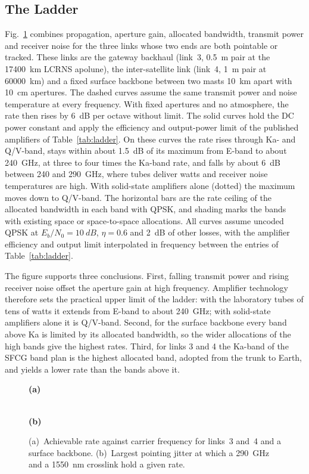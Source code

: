 \documentclass{IEEEoj}
\begin{document}
\subsection{The Ladder}
\label{sec:ladder}
Fig.~\ref{fig:ladder} combines propagation, aperture gain, allocated bandwidth, transmit power and receiver noise for the three links whose two ends are both pointable or tracked. These links are the gateway backhaul (link~3, \SI{0.5}{m} pair at the \SI{17400}{km} LCRNS apolune), the inter-satellite link (link~4, \SI{1}{m} pair at \SI{60000}{km}) and a fixed surface backbone between two masts \SI{10}{km} apart with \SI{10}{cm} apertures. The dashed curves assume the same transmit power and noise temperature at every frequency. With fixed apertures and no atmosphere, the rate then rises by 6~dB per octave without limit. The solid curves hold the DC power constant and apply the efficiency and output-power limit of the published amplifiers of Table~\ref{tab:ladder}. On these curves the rate rises through Ka- and Q/V-band, stays within about \SI{1.5}{dB} of its maximum from E-band to about \SI{240}{GHz}, at three to four times the Ka-band rate, and falls by about \SI{6}{dB} between 240 and \SI{290}{GHz}, where tubes deliver watts and receiver noise temperatures are high. With solid-state amplifiers alone (dotted) the maximum moves down to Q/V-band. The horizontal bars are the rate ceiling of the allocated bandwidth in each band with QPSK, and shading marks the bands with existing space or space-to-space allocations. All curves assume uncoded QPSK at $E_b/N_0 = \SI{10}{dB}$, $\eta = 0.6$ and \SI{2}{dB} of other losses, with the amplifier efficiency and output limit interpolated in frequency between the entries of Table~\ref{tab:ladder}.

The figure supports three conclusions. First, falling transmit power and rising receiver noise offset the aperture gain at high frequency. Amplifier technology therefore sets the practical upper limit of the ladder: with the laboratory tubes of tens of watts it extends from E-band to about \SI{240}{GHz}; with solid-state amplifiers alone it is Q/V-band. Second, for the surface backbone every band above Ka is limited by its allocated bandwidth, so the wider allocations of the high bands give the highest rates. Third, for links 3 and 4 the Ka-band of the SFCG band plan is the highest allocated band, adopted from the trunk to Earth, and yields a lower rate than the bands above it.

\begin{figure}[!t]
\centering
{\sffamily\footnotesize\bfseries (a)}\par
\\[4pt]
{\sffamily\footnotesize\bfseries (b)}\par

\caption{(a)~Achievable rate against carrier frequency for links~3 and~4 and a surface backbone. (b)~Largest pointing jitter at which a \SI{290}{GHz} and a \SI{1550}{nm} crosslink hold a given rate.}
\label{fig:ladder}
\end{figure}
\end{document}
